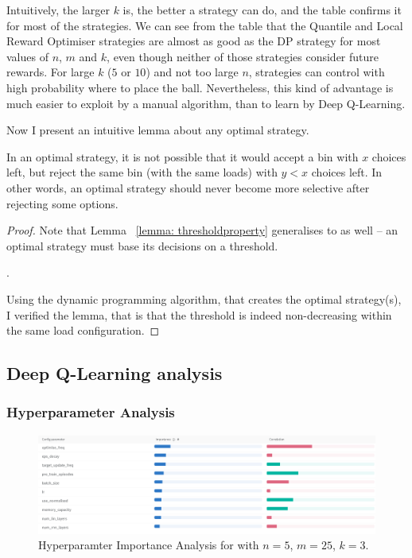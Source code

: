 Intuitively, the larger $k$ is, the better a strategy can do, and the table confirms it for most of the strategies. We can see from the table that the Quantile and Local Reward Optimiser strategies are almost as good as the DP strategy for most values of $n$, $m$ and $k$, even though neither of those strategies consider future rewards. For large $k$ ($5$ or $10$) and not too large $n$, strategies can control with high probability where to place the ball. Nevertheless, this kind of advantage is much easier to exploit by a manual algorithm, than to learn by Deep Q-Learning.



Now I present an intuitive lemma about any optimal strategy.


\begin{lemma} \label{lemma: k-thinning-increasing-threshold}
In an optimal strategy, it is not possible that it would accept a bin with $x$ choices left, but reject the same bin (with the same loads) with $y<x$ choices left. In other words, an optimal strategy should never become more selective after rejecting some options.
\end{lemma}


\begin{proof}
Note that Lemma ~\ref{lemma: thresholdproperty} generalises to \KThinning as well -- an optimal strategy must base its decisions on a threshold.


.


Using the dynamic programming algorithm, that creates the optimal strategy(s), I verified the lemma, that is that the threshold is indeed non-decreasing within the same load configuration.
\end{proof}


\subsection{Deep Q-Learning analysis}



\subsubsection{Hyperparameter Analysis}


\begin{figure}[hbt!] \label{k-thinning-hyperparameter-analysis}
    \centering
    \includegraphics[scale=0.4]{Chapter4/Figs/Hyperparameter_analysis_5_25_3.png}
    \caption{Hyperparamter Importance Analysis for \KThinning with $n=5$, $m=25$, $k=3$. \cite{biewald2020wandb}}
\end{figure}

